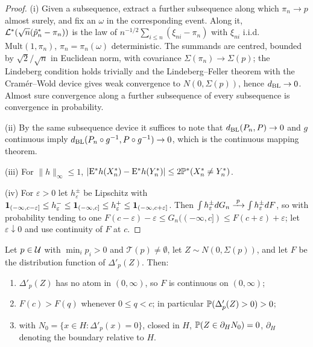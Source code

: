 \begin{proof}
(i) Given a subsequence, extract a further subsequence along which $\pi_n\to p$ almost surely, and fix an $\omega$ in the corresponding event. Along it, $\mathcal{L}^\ast(\sqrt n(\hat p^\ast_n-\pi_n))$ is the law of $n^{-1/2}\sum_{i\le n}(\xi_{ni}-\pi_n)$ with $\xi_{ni}$ i.i.d.\ $\mathrm{Mult}(1,\pi_n)$, $\pi_n=\pi_n(\omega)$ deterministic. The summands are centred, bounded by $\sqrt2/\sqrt n$ in Euclidean norm, with covariance $\Sigma(\pi_n)\to\Sigma(p)$; the Lindeberg condition holds trivially and the Lindeberg--Feller theorem with the Cram\'er--Wold device gives weak convergence to $N(0,\Sigma(p))$, hence $d_{\mathrm{BL}}\to0$. Almost sure convergence along a further subsequence of every subsequence is convergence in probability.

(ii) By the same subsequence device it suffices to note that $d_{\mathrm{BL}}(P_n,P)\to0$ and $g$ continuous imply $d_{\mathrm{BL}}(P_n\circ g^{-1},P\circ g^{-1})\to0$, which is the continuous mapping theorem.

(iii) For $\|h\|_\infty\le1$, $|\mathrm{E}^\ast h(X^\ast_n)-\mathrm{E}^\ast h(Y^\ast_n)|\le2\mathbb{P}^\ast(X^\ast_n\ne Y^\ast_n)$.

(iv) For $\varepsilon>0$ let $h^\pm_\varepsilon$ be Lipschitz with $\mathbf{1}_{(-\infty,c-\varepsilon]}\le h^-_\varepsilon\le\mathbf{1}_{(-\infty,c]}\le h^+_\varepsilon\le\mathbf{1}_{(-\infty,c+\varepsilon]}$. Then $\int h^\pm_\varepsilon dG_n\xrightarrow{\;p\;}\int h^\pm_\varepsilon dF$, so with probability tending to one $F(c-\varepsilon)-\varepsilon\le G_n((-\infty,c])\le F(c+\varepsilon)+\varepsilon$; let $\varepsilon\downarrow0$ and use continuity of $F$ at $c$.
\end{proof}

\begin{lemma}\label{lem:S-law}
Let $p\in\mathcal{U}$ with $\min_ip_i>0$ and $\mathcal T(p)\ne\emptyset$, let $Z\sim N(0,\Sigma(p))$, and let $F$ be the distribution function of $\Delta'_p(Z)$. Then:
\begin{enumerate}
\item[(i)] $\Delta'_p(Z)$ has no atom in $(0,\infty)$, so $F$ is continuous on $(0,\infty)$;
\item[(ii)] $F(c)>F(q)$ whenever $0\le q<c$; in particular $\mathbb{P}(\Delta'_p(Z)>0)>0$;
\item[(iii)] with $N_0=\{x\in H:\Delta'_p(x)=0\}$, closed in $H$, $\mathbb{P}(Z\in\partial_HN_0)=0$, $\partial_H$ denoting the boundary relative to $H$.
\end{enumerate}
\end{lemma}

